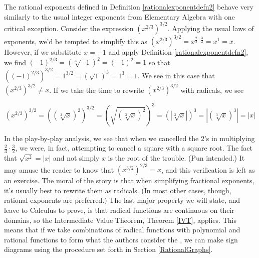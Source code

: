 \smallskip


\smallskip

The rational exponents defined in Definition \ref{rationalexponentdefn2} behave very similarly to the usual integer exponents from Elementary Algebra with one critical exception.  Consider the expression $\left(x^{2/3}\right)^{3/2}$.  Applying the usual laws of exponents, we'd be tempted to simplify this as $\left(x^{2/3}\right)^{3/2} = x^{\frac{2}{3} \cdot \frac{3}{2}} = x^{1} = x$.  However, if we substitute $x=-1$ and apply Definition \ref{rationalexponentdefn2}, we find $(-1)^{2/3} = \left(\sqrt[3]{-1}\right)^2 = (-1)^2 = 1$ so that $\left((-1)^{2/3}\right)^{3/2} = 1^{3/2} = \left(\sqrt{1}\right)^3 = 1^3 = 1$.  We see in this case that $\left(x^{2/3}\right)^{3/2} \neq x$.  If we take the time to rewrite $\left(x^{2/3}\right)^{3/2}$ with radicals, we see 

\[ \left(x^{2/3}\right)^{3/2} = \left(\left(\sqrt[3]{x}\right)^2\right)^{3/2} =  \left(\sqrt{\left(\sqrt[3]{x}\right)^2}\right)^3 =\left(\left|\sqrt[3]{x}\right|\right)^3 = \left| \left(\sqrt[3]{x}\right)^3  \right| = |x|\]

In the play-by-play analysis, we see that when we cancelled the $2$'s in multiplying $\frac{2}{3} \cdot \frac{3}{2}$, we were, in fact, attempting to cancel a square with a square root.  The fact that $\sqrt{x^2} = |x|$ and not simply $x$ is the root of the trouble. (Pun intended.)  It may amuse the reader to know that  $\left(x^{3/2}\right)^{2/3} = x$, and this verification is left as an exercise.  The moral of the story is that when simplifying fractional exponents, it's usually best to rewrite them as radicals. (In most other cases, though, rational exponents are preferred.)   The last major property we will state, and leave to Calculus to prove, is that radical functions are continuous on their domains, so the Intermediate Value Theorem, Theorem \ref{IVT}, applies.  This means that if we take combinations of radical functions with polynomial and rational functions to form what the authors consider  the , we can make sign diagrams using the procedure set forth in Section \ref{RationalGraphs}.  


